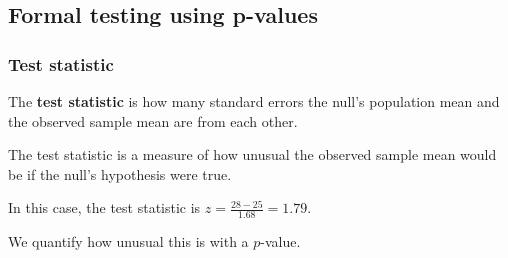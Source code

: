 

\subsection{Formal testing using p-values}


\begin{frame}
\frametitle{Test statistic}


The {\bf test statistic} is how many standard errors the null's population mean and the observed sample mean are from each other. \pause

The test statistic is a measure of how unusual the observed sample mean would be if the null's hypothesis were true. \pause

{
   In this case, the test statistic is $z = \frac{28-25}{1.68} = 1.79$. \pause
   \vspace{10pt}
      
   We quantify how unusual this is with a $p$-value.
}

\end{frame}

